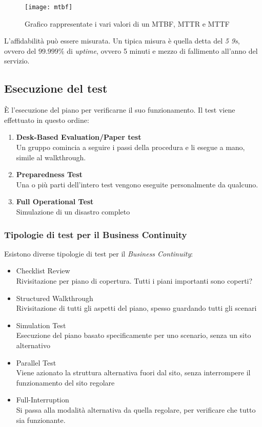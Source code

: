 \begin{figure}[H]
 \centering
 \texttt{[image: mtbf]}
 \caption{Grafico rappresentate i vari valori di un MTBF, MTTR e MTTF}
\end{figure}


L'affidabilità può essere misurata. Un tipica misura è quella detta del 
\textit{5 9s}, ovvero del $99.999\%$ di \textit{uptime}, ovvero 5 minuti e 
mezzo di fallimento all'anno del servizio.

\subsection{Esecuzione del test}

È l'esecuzione del piano per verificarne il suo funzionamento.
Il test viene effettuato in questo ordine:
\begin{enumerate}
  \item \textbf{Desk-Based Evaluation/Paper test} \\
  Un gruppo comincia a seguire i passi della procedura e li esegue a mano, simile al walkthrough.
  \item \textbf{Preparedness Test} \\
  Una o più parti dell'intero test vengono eseguite personalmente da qualcuno.
  \item \textbf{Full Operational Test} \\
  Simulazione di un disastro completo
\end{enumerate}

\subsubsection{Tipologie di test per il Business Continuity}

Esistono diverse tipologie di test per il \textit{Business Continuity}:
\begin{itemize}
  \item Checklist Review \\
  Rivisitazione per piano di copertura. Tutti i piani importanti sono coperti?
  \item Structured Walkthrough \\
  Rivisitazione di tutti gli aspetti del piano, spesso guardando tutti gli 
  scenari
  \item Simulation Test \\
  Esecuzione del piano basato specificamente per uno scenario, senza un sito 
  alternativo
  \item Parallel Test \\
  Viene azionato la struttura alternativa fuori dal sito, senza 
  interrompere il funzionamento del sito regolare
  \item Full-Interruption \\
  Si passa alla modalità alternativa da quella regolare, per verificare che 
  tutto sia funzionante.
\end{itemize}

